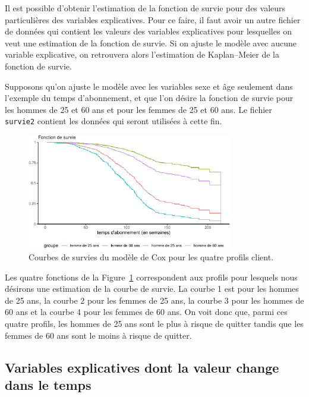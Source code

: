 \documentclass[
  11pt,
  letterpaper,
]{scrbook}
\theoremstyle{definition}
\theoremstyle{remark}
\begin{document}
Il est possible d'obtenir l'estimation de la fonction de survie pour des
valeurs particulières des variables explicatives. Pour ce faire, il faut
avoir un autre fichier de données qui contient les valeurs des variables
explicatives pour lesquelles on veut une estimation de la fonction de
survie. Si on ajuste le modèle avec aucune variable explicative, on
retrouvera alors l'estimation de Kaplan--Meier de la fonction de survie.

Supposons qu'on ajuste le modèle avec les variables sexe et âge
seulement dans l'exemple du temps d'abonnement, et que l'on désire la
fonction de survie pour les hommes de 25 et 60 ans et pour les femmes de
25 et 60 ans. Le fichier \texttt{survie2} contient les données qui
seront utilisées à cette fin.

\begin{figure}[ht!]

{\centering \includegraphics[width=0.8\textwidth,height=\textheight]{./06-survie_files/figure-pdf/fig-courbes-survie-1.pdf}

}

\caption{\label{fig-courbes-survie}Courbes de survies du modèle de Cox
pour les quatre profils client.}

\end{figure}

Les quatre fonctions de la Figure~\ref{fig-courbes-survie} correspondent
aux profils pour lesquels nous désirons une estimation de la courbe de
survie. La courbe 1 est pour les hommes de 25 ans, la courbe 2 pour les
femmes de 25 ans, la courbe 3 pour les hommes de 60 ans et la courbe 4
pour les femmes de 60 ans. On voit donc que, parmi ces quatre profils,
les hommes de 25 ans sont le plus à risque de quitter tandis que les
femmes de 60 ans sont le moins à risque de quitter.

\hypertarget{variables-explicatives-dont-la-valeur-change-dans-le-temps}{%
\subsection{Variables explicatives dont la valeur change dans le
temps}\label{variables-explicatives-dont-la-valeur-change-dans-le-temps}}
\end{document}
